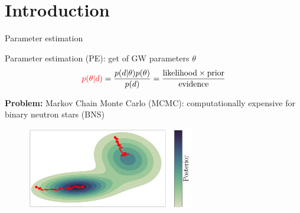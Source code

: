 \documentclass[usenames,dvipsnames,t]{beamer}
\begin{document}







\section{Introduction}

\begin{frame}{Parameter estimation}

\def\x{3mm}
\def\y{2mm}

Parameter estimation (PE): get  of GW parameters $\theta$ %
\begin{equation*}
    \textcolor{red}{p(\theta | d)} = \frac{p(d | \theta) p(\theta)}{p(d)} = \frac{\text{likelihood} \times \text{prior}}{\text{evidence}}
\end{equation*}

\vspace{1mm}

\begin{tcolorbox}[colback=blue!10, boxrule=0pt]
  \textbf{Problem:} Markov Chain Monte Carlo (MCMC): computationally expensive for binary neutron stars (BNS)
\end{tcolorbox}

\vspace{-1mm}

\begin{figure}
  \centering
  \includegraphics[width=0.65\textwidth]{Figures/mixture_of_gaussians_projection_no_title_colorbar.pdf}
  \caption*{}
\end{figure}

\end{frame}
\end{document}
